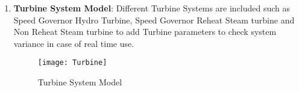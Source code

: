 \begin{enumerate}
\begin{itemize}
		\item \textbf{\large Swing Equation Model}: The model shown in Fig. \ref{swing eqn} is for the equation governing the motion of the rotor of a synchronous machine as described previously in Section-2.1 .
		\begin{equation}
		J\frac{d^2\theta_m}{{d(t)}^2}= T_a = T_m - T_e
		\end{equation}
		\begin{figure}[H]
		 \centering
		\texttt{[image: swing eqn]}
		\caption{Swing Equation Model}
		\label{swing eqn}
		\end{figure}
		
	\end{itemize}
\item \textbf{\large Turbine System Model}: Different Turbine Systems are included such as Speed Governor Hydro Turbine, Speed Governor Reheat Steam turbine and Non Reheat Steam turbine to add Turbine parameters to check system variance in case of real time use.
	
	\begin{figure}[H]
	 \centering
	\texttt{[image: Turbine]}
	\caption{Turbine System Model}
	\label{Turbine System Model}
	\end{figure}
	

\end{enumerate}
